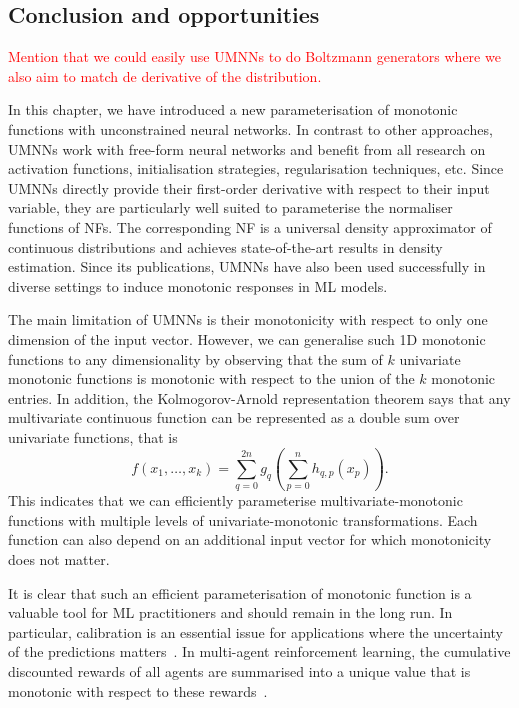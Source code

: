 \subsection{Conclusion and opportunities}
\textcolor{red}{Mention that we could easily use UMNNs to do Boltzmann generators where we also aim to match de derivative of the distribution.}


In this chapter, we have introduced a new parameterisation of monotonic functions with unconstrained neural networks. In contrast to other approaches, UMNNs work with free-form neural networks and benefit from all research on activation functions, initialisation strategies, regularisation techniques, etc. Since UMNNs directly provide their first-order derivative with respect to their input variable, they are particularly well suited to parameterise the normaliser functions of NFs. The corresponding NF is a universal density approximator of continuous distributions and achieves state-of-the-art results in density estimation. Since its publications, UMNNs have also been used successfully in diverse settings to induce monotonic responses in ML models.

The main limitation of UMNNs is their monotonicity with respect to only one dimension of the input vector. However, we can generalise such 1D monotonic functions to any dimensionality by observing that the sum of $k$ univariate monotonic functions is monotonic with respect to the union of the $k$ monotonic entries. In addition, the Kolmogorov-Arnold representation theorem says that any multivariate continuous function can be represented as a double sum over univariate functions, that is
$$ f(x_1, \dots, x_k) = \sum_{q=0}^{2n}g_q\left( \sum_{p=0}^{n} h_{q,p}(x_p) \right). $$
This indicates that we can efficiently parameterise multivariate-monotonic functions with multiple levels of univariate-monotonic transformations. Each function can also depend on an additional input vector for which monotonicity does not matter.

It is clear that such an efficient parameterisation of monotonic function is a valuable tool for ML practitioners and should remain in the long run. In particular, calibration is an essential issue for applications where the uncertainty of the predictions matters~\citep{minderer2021revisiting, guo2017calibration, cranmer2015approximating}. In multi-agent reinforcement learning, the cumulative discounted rewards of all agents are summarised into a unique value that is monotonic with respect to these rewards~\citep{rashid2018qmix, leroy2020qvmix}.

